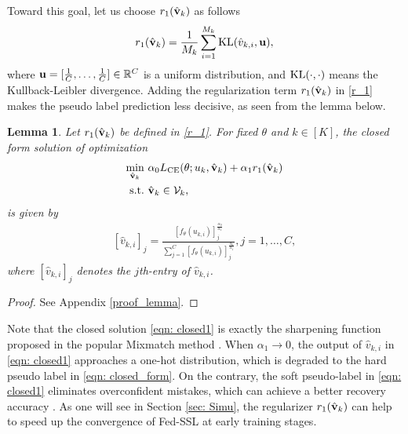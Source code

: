 \documentclass[twoside,journal]{IEEEtran}
\def\VectorFont{\bf}
\newcommand{\vu}{{\VectorFont u}}
\newcommand{\vv}{{\VectorFont v}}
\newtheorem{lemma}{Lemma}
\begin{document}
Toward this goal, let us  choose  $r_1(\hat{\vv}_k)$ as follows
\begin{align}\label{r_1}
r_1(\hat{\vv}_k)=\frac{1}{M_k}\sum_{i=1}^{M_k} {\rm KL}(\hat{v}_{k,i},\vu) ,
\end{align}
where $\vu=[\frac{1}{C},\ldots,\frac{1}{C}]\in\mathbb{R}^C$ is a uniform distribution, and
${\rm KL}(\cdot,\cdot)$ means the Kullback-Leibler divergence. Adding the regularization term $r_1(\hat{\vv}_k)$ in \eqref{r_1} makes the pseudo label prediction less decisive, as seen from the lemma below.
\begin{lemma}\label{lem: pseudo}
Let $r_1(\hat{\vv}_k)$ be defined in \eqref{r_1}. For fixed $\theta$ and $k\in[K]$, the closed form solution of optimization
\begin{subequations}\label{update_y}
	\begin{align}
	\min_{ \substack{\hat{\vv}_{k}}}~ &  \alpha_0L_{\rm CE}(\theta; u_{k}, \hat{\vv}_{k})+\alpha_1 r_1(\hat{\vv}_{k})\label{eqn:update_y1} \\
	{\rm s.t.}~ & \hat{\vv}_k\in\mathcal{V}_k,   \label{eqn:update_y2}
	\end{align}
\end{subequations}
is given by
\begin{align}\label{eqn: closed1}
[\hat{v}_{k,i}]_j = \frac{[f_{\theta}(u_{k,i})]_j^{\frac{\alpha_0}{\alpha_1}}}{\sum_{j=1}^C
[f_{\theta}(u_{k,i})]_j^{\frac{\alpha_0}{\alpha_1}}}, j=1,\ldots,C,
\end{align}
where $[\hat{v}_{k,i}]_j$ denotes the $j$th-entry of $\hat{v}_{k,i}$.
\end{lemma}
\begin{proof}
See Appendix \ref{proof_lemma}.
\end{proof}
Note that the closed solution \eqref{eqn: closed1} is exactly  the sharpening function  proposed in the popular Mixmatch method \cite{berthelot2019mixmatch}. When $\alpha_1\rightarrow 0$, the output of $\hat{v}_{k,i}$ in \eqref{eqn: closed1} approaches a one-hot distribution, which is degraded to the hard pseudo label in \eqref{eqn: closed_form}.  On the contrary, the soft pseudo-label in  \eqref{eqn: closed1} eliminates overconfident mistakes, which can achieve a better recovery accuracy  \cite{Tanaka12018}. As one will see in Section \ref{sec: Simu}, the regularizer $r_1(\hat{\vv}_k)$ can help to speed up the convergence of Fed-SSL at early training stages.
\end{document}
